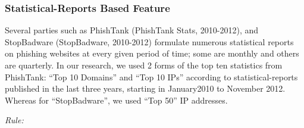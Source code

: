\documentclass[twocolumn,10pt]{article}
\begin{document}
\subsubsection{Statistical-Reports Based Feature}
Several parties such as PhishTank (PhishTank Stats, 2010-2012), and StopBadware (StopBadware,
2010-2012) formulate numerous statistical reports on phishing websites at every given period of time;
some are monthly and others are quarterly. In our research, we used 2 forms of the top ten statistics
from PhishTank: “Top 10 Domains” and “Top 10 IPs” according to statistical-reports published in the
last three years, starting in January2010 to November 2012. Whereas for “StopBadware”, we used
“Top 50” IP addresses.
\begin{center}
\it Rule:
\end{center}
\end{document}
